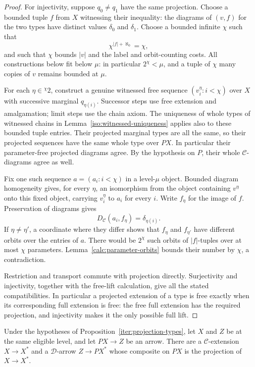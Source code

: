 \begin{proof}
For injectivity, suppose $q_0\ne q_1$ have the same projection.
Choose a bounded tuple $f$ from $X$ witnessing their inequality:
the diagrams of $(v,f)$ for the two types have distinct values
$\delta_0$ and $\delta_1$. Choose a bounded infinite $\chi$ such
that
\[
 \chi^{|f|+\aleph_0}=\chi,
\]
and such that $\chi$ bounds $|v|$ and the label and orbit-counting
costs. All constructions below fit below $\mu$: in particular
$2^\chi<\mu$, and a tuple of $\chi$ many copies of $v$ remains
bounded at $\mu$.

For each $\eta\in{}^\chi 2$, construct a genuine witnessed free
sequence $(v_i^\eta:i<\chi)$ over $X$ with successive marginal
$q_{\eta(i)}$. Successor steps use free extension and amalgamation;
limit steps use the chain axiom. The uniqueness of whole types of
witnessed chains in Lemma~\ref{iso:witnessed-uniqueness} applies also
to these bounded tuple entries. Their projected marginal types
are all the same, so their projected sequences have the same whole
type over $PX$. In particular their parameter-free projected
diagrams agree. By the hypothesis on $P$, their whole
$\mathcal C$-diagrams agree as well.

Fix one such sequence $a=(a_i:i<\chi)$ in a level-$\mu$ object.
Bounded diagram homogeneity gives, for every $\eta$, an isomorphism
from the object containing $v^\eta$ onto this fixed object, carrying
$v_i^\eta$ to $a_i$ for every $i$. Write $f_\eta$ for the image
of $f$. Preservation of diagrams gives
\[
 D_{\mathcal C}(a_i,f_\eta)=\delta_{\eta(i)}.
\]
If $\eta\ne\eta'$, a coordinate where they differ shows that
$f_\eta$ and $f_{\eta'}$ have different orbits over the entries
of $a$. There would be $2^\chi$ such orbits of $|f|$-tuples over
at most $\chi$ parameters. Lemma~\ref{calc:parameter-orbits}
bounds their number by $\chi$, a contradiction.

Restriction and transport commute with projection directly.
Surjectivity and injectivity, together with the free-lift calculation,
give all the stated compatibilities. In particular a projected
extension of a type is free exactly when its corresponding full
extension is free: the free full extension has the required
projection, and injectivity makes it the only possible full lift.
\end{proof}

\begin{corollary}
\label{iter:projection-extension}
Under the hypotheses of Proposition~\ref{iter:projection-types},
let $X$ and $Z$ be at the same eligible level, and let
$PX\longrightarrow Z$ be an arrow. There are a
$\mathcal C$-extension $X\longrightarrow X^*$ and a
$\mathcal D$-arrow $Z\longrightarrow PX^*$ whose composite on
$PX$ is the projection of $X\longrightarrow X^*$.
\end{corollary}

